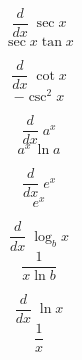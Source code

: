 \documentclass[avery5371,grid]{flashcards}
\begin{document}
\begin{flashcard}{\large \vspace*{\fill} \[ \dfrac{d}{dx}\; \sec x  \] \vspace*{\fill}   }{\large \vspace*{\fill} \[ \sec x \tan x  \] \vspace*{\fill}   }\end{flashcard}

\begin{flashcard}{\large \vspace*{\fill} \[ \dfrac{d}{dx}\; \cot x  \] \vspace*{\fill}   }{\large \vspace*{\fill} \[ -\csc^2 x   \] \vspace*{\fill}   }\end{flashcard}

\begin{flashcard}{\large \vspace*{\fill} \[ \dfrac{d}{dx}\; a^x  \] \vspace*{\fill}   }{\large \vspace*{\fill} \[ a^x \, \ln a   \] \vspace*{\fill}   }\end{flashcard}

\begin{flashcard}{\large \vspace*{\fill} \[ \dfrac{d}{dx}\;  e^x  \] \vspace*{\fill}   }{\large \vspace*{\fill} \[ e^x   \] \vspace*{\fill}   }\end{flashcard}





\begin{flashcard}{\large \vspace*{\fill} \[ \dfrac{d}{dx}\; \log_b x  \] \vspace*{\fill}   }{\large \vspace*{\fill} \[ \dfrac{1}{x \ln b}  \] \vspace*{\fill}   }\end{flashcard}

\begin{flashcard}{\large \vspace*{\fill} \[ \dfrac{d}{dx}\; \ln x  \] \vspace*{\fill}   }{\large \vspace*{\fill} \[ \dfrac{1}{x}   \] \vspace*{\fill}   }\end{flashcard}
\end{document}
